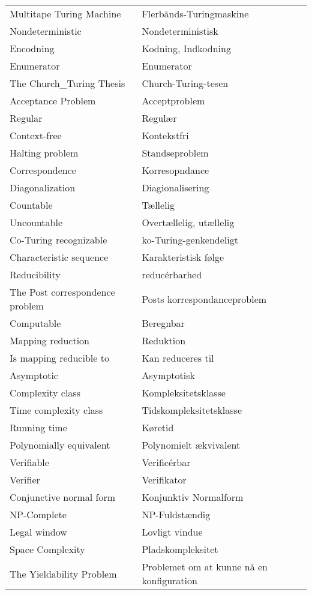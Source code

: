 \begin{longtable}[c]{ll}
  Multitape Turing Machine & Flerbånds-Turingmaskine \\
  Nondeterministic & Nondeterministisk \\
  Encodning & Kodning, Indkodning \\
  Enumerator & Enumerator \\
  The Church\_Turing Thesis & Church-Turing-tesen \\
  Acceptance Problem & Acceptproblem \\
  Regular & Regulær \\
  Context-free & Kontekstfri\\
  Halting problem & Standseproblem \\
  Correspondence & Korresopndance \\
  Diagonalization & Diagionalisering \\
  Countable & Tællelig \\
  Uncountable & Overtællelig, utællelig \\
  Co-Turing recognizable & ko-Turing-genkendeligt \\
  Characteristic sequence & Karakteristisk følge \\
  Reducibility & reducérbarhed \\
  The Post correspondence problem & Posts korrespondanceproblem \\
  Computable & Beregnbar \\
  Mapping reduction & Reduktion \\
  Is mapping reducible to & Kan reduceres til \\
  Asymptotic & Asymptotisk \\
  Complexity class & Kompleksitetsklasse \\
  Time complexity class & Tidskompleksitetsklasse \\
  Running time & Køretid \\
  Polynomially equivalent & Polynomielt ækvivalent \\
  Verifiable & Verificérbar \\
  Verifier & Verifikator \\
  Conjunctive normal form & Konjunktiv Normalform \\
  NP-Complete & NP-Fuldstændig \\
  Legal window & Lovligt vindue \\
  Space Complexity & Pladskompleksitet \\
  The Yieldability Problem & Problemet om at kunne nå en konfiguration
\end{longtable}

